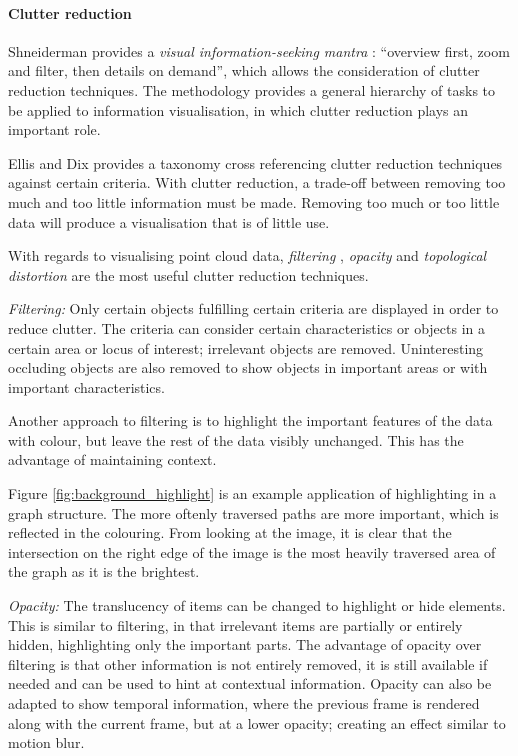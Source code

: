 \paragraph{Clutter reduction}
\label{sub:background_clutter}

Shneiderman provides a \emph{visual information-seeking mantra}
\citep{shneiderman96}: ``overview first, zoom and filter, then details on
demand'', which allows the consideration of clutter reduction techniques. The
methodology provides a general hierarchy of tasks to be applied to information
visualisation, in which clutter reduction plays an important role.

Ellis and Dix \citep{ellis07} provides a taxonomy cross referencing clutter
reduction techniques against certain criteria. With clutter reduction, a
trade-off between removing too much and too little information must be made.
Removing too much or too little data will produce a visualisation that is of
little use.

With regards to visualising point cloud data, \emph{filtering} \citep{stone94},
\emph{opacity} \citep{kosara02} and \emph{topological distortion}
\citep{lamping96} are the most useful clutter reduction techniques.

\emph{Filtering:} Only certain objects fulfilling certain criteria are
displayed in order to reduce clutter. The criteria can consider certain
characteristics or objects in a certain area or locus of interest; irrelevant
objects are removed. Uninteresting occluding objects are also removed to show
objects in important areas or with important characteristics.

Another approach to filtering is to highlight the important features of the
data with colour, but leave the rest of the data visibly unchanged. This has
the advantage of maintaining context.

Figure \ref{fig:background_highlight} is an example application of highlighting
in a graph structure. The more oftenly traversed paths are more important,
which is reflected in the colouring. From looking at the image, it is clear
that the intersection on the right edge of the image is the most heavily
traversed area of the graph as it is the brightest.

\emph{Opacity:} The translucency of items can be changed to highlight or hide
elements. This is similar to filtering, in that irrelevant items are partially
or entirely hidden, highlighting only the important parts. The advantage of
opacity over filtering is that other information is not entirely removed, it is
still available if needed and can be used to hint at contextual information.
Opacity can also be adapted to show temporal information, where the previous
frame is rendered along with the current frame, but at a lower opacity;
creating an effect similar to motion blur.

